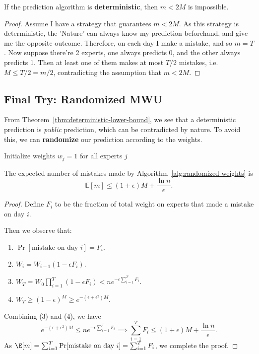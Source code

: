 \begin{theorem} \label{thm:deterministic-lower-bound}
	If the prediction algorithm is \textbf{deterministic}, then $m<2M$ is impossible.
\end{theorem}

\begin{proof}
	Assume I have a strategy that guarantees $m < 2M$. As this strategy is deterministic, the 'Nature' can always know my prediction beforehand, and give me the opposite outcome. Therefore, on each day I make a mistake, and so $m = T$.
	Now suppose there're 2 experts, one always predicts 0, and the other always predicts 1. Then at least one of them makes at most $T/2$ mistakes, i.e. $M \leq T/2 = m/2$, contradicting the assumption that $m < 2M$.
\end{proof}

\subsection{Final Try: Randomized MWU}

From Theorem~\ref{thm:deterministic-lower-bound}, we see that a deterministic prediction is \textit{public} prediction, which can be contradicted by nature. To avoid this, we can \textbf{randomize} our prediction according to the weights.

\begin{algorithm}[H]
	\caption{Randomized MWU Algorithm}
	\label{alg:randomized-weights}
	Initialize weights $w_j = 1$ for all experts $j$\;
\end{algorithm}

\begin{theorem}
	The expected number of mistakes made by Algorithm~\ref{alg:randomized-weights} is
	\[ \mathbb{E}[m] \leq (1+\epsilon) M + \frac{\ln n}{\epsilon}. \]
\end{theorem}

\begin{proof}
	Define $F_i$ to be the fraction of total weight on experts that made a mistake on day $i$.

	Then we observe that:
	\begin{enumerate}
		\item $\Pr[\text{mistake on day } i] = F_i$.
		\item $W_i = W_{i-1} (1 - \epsilon F_i)$.
		\item $W_T = W_0 \prod_{i=1}^T (1 - \epsilon F_i) < n e^{-\epsilon \sum_{i=1}^T F_i}$.
		\item $W_T \geq (1 - \epsilon)^M \geq e^{-(\epsilon + \epsilon^2) M}$.
	\end{enumerate}
	Combining (3) and (4), we have
	\[ e^{-(\epsilon + \epsilon^2) M} \leq n e^{-\epsilon \sum_{i=1}^T F_i} \implies \sum_{i=1}^T F_i \leq (1+\epsilon) M + \frac{\ln n}{\epsilon}. \]
	As $\E[m] = \sum_{i=1}^T \Pr[\text{mistake on day } i] = \sum_{i=1}^T F_i$, we complete the proof.
\end{proof}
